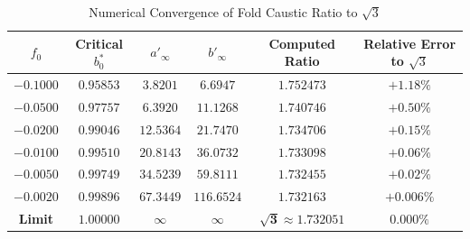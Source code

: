 \documentclass[12pt]{article}
\begin{document}
\begin{table}[h]
\centering
\caption{Numerical Convergence of Fold Caustic Ratio to $\sqrt{3}$}
\vspace{0.5em}
\begin{tabular}{cccccc}
\toprule
$f_0$ & Critical $b_0^*$ & $a'_\infty$ & $b'_\infty$ & Computed Ratio & Relative Error to $\sqrt{3}$ \\
\midrule
$-0.1000$ & $0.95853$ & $3.8201$ & $6.6947$ & $1.752473$ & $+1.18\%$ \\
$-0.0500$ & $0.97757$ & $6.3920$ & $11.1268$ & $1.740746$ & $+0.50\%$ \\
$-0.0200$ & $0.99046$ & $12.5364$ & $21.7470$ & $1.734706$ & $+0.15\%$ \\
$-0.0100$ & $0.99510$ & $20.8143$ & $36.0732$ & $1.733098$ & $+0.06\%$ \\
$-0.0050$ & $0.99749$ & $34.5239$ & $59.8111$ & $1.732455$ & $+0.02\%$ \\
$-0.0020$ & $0.99896$ & $67.3449$ & $116.6524$ & $1.732163$ & $+0.006\%$ \\
\midrule
\textbf{Limit} & \textbf{$1.00000$} & $\infty$ & $\infty$ & $\mathbf{\sqrt{3} \approx 1.732051}$ & \textbf{$0.000\%$} \\
\bottomrule
\end{tabular}
\end{table}
\end{document}

